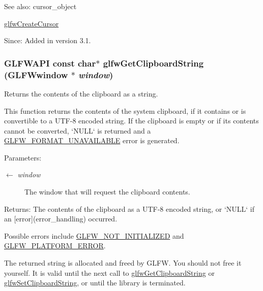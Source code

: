 \begin{Desc}
\item[See also:]cursor\_\-object 

\hyperlink{group__input_gc0f0f691f2d110f9acfb4bfe07f1216c}{glfwCreateCursor}\end{Desc}
\begin{Desc}
\item[Since:]Added in version 3.1. \end{Desc}
\hypertarget{group__input_g3ac90c8bbaf0b46063bb02b574f3b6f7}{
\subsubsection[glfwGetClipboardString]{\setlength{\rightskip}{0pt plus 5cm}GLFWAPI const char$\ast$ glfwGetClipboardString ({\bf GLFWwindow} $\ast$ {\em window})}}
\label{group__input_g3ac90c8bbaf0b46063bb02b574f3b6f7}


Returns the contents of the clipboard as a string. 

This function returns the contents of the system clipboard, if it contains or is convertible to a UTF-8 encoded string. If the clipboard is empty or if its contents cannot be converted, `NULL` is returned and a \hyperlink{group__errors_g196e125ef261d94184e2b55c05762f14}{GLFW\_\-FORMAT\_\-UNAVAILABLE} error is generated.

\begin{Desc}
\item[Parameters:]
\begin{description}
\item[\mbox{$\leftarrow$} {\em window}]The window that will request the clipboard contents. \end{description}
\end{Desc}
\begin{Desc}
\item[Returns:]The contents of the clipboard as a UTF-8 encoded string, or `NULL` if an \mbox{[}error\mbox{]}(error\_\-handling) occurred.\end{Desc}
Possible errors include \hyperlink{group__errors_g2374ee02c177f12e1fa76ff3ed15e14a}{GLFW\_\-NOT\_\-INITIALIZED} and \hyperlink{group__errors_gd44162d78100ea5e87cdd38426b8c7a1}{GLFW\_\-PLATFORM\_\-ERROR}.

The returned string is allocated and freed by GLFW. You should not free it yourself. It is valid until the next call to \hyperlink{group__input_g3ac90c8bbaf0b46063bb02b574f3b6f7}{glfwGetClipboardString} or \hyperlink{group__input_g7a580309bbc185a0459c3559021d2fd7}{glfwSetClipboardString}, or until the library is terminated.

